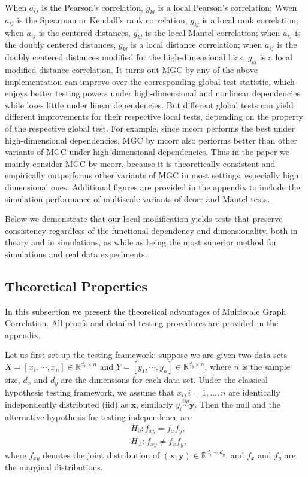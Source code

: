 \documentclass[11pt]{article}
\providecommand{\mb}[1]{\boldsymbol{#1}}
\newcommand{\Real}{\mathbb{R}}
\newcommand{\jv}[1]{{\color{red}{#1}}}
\newcommand{\cs}[1]{{\color{blue}{#1}}}
\begin{document}
When $a_{ij}$ is the Pearson's correlation, $g_{kl}$ is a local Pearson's correlation;
Wwen $a_{ij}$ is the Spearman or Kendall's rank correlation, $g_{kl}$ is a local rank correlation;
when $a_{ij}$ is the centered distances, $g_{kl}$ is the local Mantel correlation;
when $a_{ij}$ is the doubly centered distances, $g_{kl}$ is a local distance correlation;
when $a_{ij}$ is the doubly centered distances modified for the high-dimensional bias, $g_{kl}$ is a local modified distance correlation.  
It turns out MGC by any of the above implementation can improve over the corresponding global test statistic, which enjoys better testing powers under high-dimensional and nonlinear dependencies while loses little under linear dependencies. But different global tests can yield different improvements for their respective local tests, depending on the property of the respective global test. For example, since mcorr performs the best under high-dimensional dependencies, MGC by mcorr also performs better than other variants of MGC under high-dimensional dependencies. Thus in the paper we mainly consider MGC by mcorr, because it is theoretically consistent and empirically outperforms other variants of MGC in most settings, especially high dimensional ones. Additional figures are provided in the appendix to include the simulation performance of multiscale variants of dcorr and  Mantel tests. 

Below we demonstrate that our local modification yields tests that preserve consistency regardless of the functional dependency and dimensionality, both in theory and in simulations, as while as being the most superior method for simulations and real data experiments.

\cs{I have also added running time, and choose neighborhood explanation for MGC above, to be in line with your words regarding the local parameters}
\jv{do we compute actual running times? shall we?}

\subsection{Theoretical Properties}
\label{main4}
In this subsection we present the theoretical advantages of Multiscale Graph Correlation. All proofs and detailed testing procedures are provided in the appendix. 

Let us first set-up the testing framework: suppose we are given two data sets $X=[x_{1},\cdots, x_{n}] \in \Real^{d_{x} \times n}$ and $Y=[y_{1},\cdots, y_{n}] \in \Real^{d_{y} \times n}$, where $n$ is the sample size, $d_{x}$ and $d_{y}$ are the dimensions for each data set. Under the classical hypothesis testing framework, we assume that $x_{i}, i=1,\ldots,n$ are identically independently distributed (iid) as $\mb{x}$, similarly $y_{i} \stackrel{iid}{\sim} \mb{y}$. Then the null and the alternative hypothesis for testing independence are
\begin{align*}
& H_{0}: f_{xy}=f_{x}f_{y},\\
& H_{A}: f_{xy} \neq f_{x}f_{y},
\end{align*}
where $f_{xy}$ denotes the joint distribution of $(\mb{x},\mb{y}) \in \Real^{d_{x} + d_{y}}$, and $f_{x}$ and $f_{y}$ are the marginal distributions. 
\end{document}

